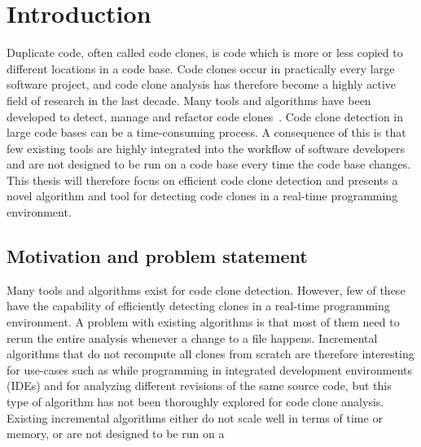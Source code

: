 \chapter{Introduction}

%

Duplicate code, often called code clones, is code which is more or less copied to
different locations in a code base. Code clones occur in practically every large software
project, and code clone analysis has therefore become a highly active field of research in
the last decade. Many tools and algorithms have been developed to detect, manage and
refactor code clones~\cite[6]{Inoue_introduction_to_cc}. Code clone detection in large
code bases can be a time-consuming process. A consequence of this is that few existing
tools are highly integrated into the workflow of software developers and are not designed
to be run on a code base every time the code base changes. This thesis will therefore
focus on efficient code clone detection and presents a novel algorithm and tool for
detecting code clones in a real-time programming environment.

\section{Motivation and problem statement}

Many tools and algorithms exist for code clone detection. However, few of these have the
capability of efficiently detecting clones in a real-time programming environment. A
problem with existing algorithms is that most of them need to rerun the entire analysis
whenever a change to a file happens. Incremental algorithms that do not recompute all
clones from scratch are therefore interesting for use-cases such as while programming in
integrated development environments (IDEs) and for analyzing different revisions of the
same source code, but this type of algorithm has not been thoroughly explored for code
clone analysis. Existing incremental algorithms either do not scale well in terms of time
or memory, or are not designed to be run on a 

